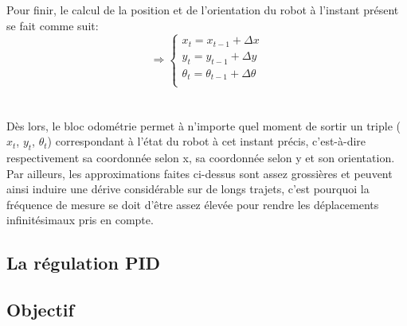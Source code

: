 \documentclass[a4paper,11pt]{article}
\begin{document}
Pour finir, le calcul de la position et de l'orientation du robot à l'instant présent se fait comme suit:
\begin{equation*}
    \Rightarrow\left\{
      \begin{aligned}
        x_{t} = x_{t-1} + \Delta x\\
        y_{t} = y_{t-1} + \Delta y\\
        \theta_{t} = \theta_{t-1} + \Delta\theta\\
        \end{aligned}
    \right.
\end{equation*}\\\\
Dès lors, le bloc odométrie permet à n'importe quel moment de sortir un triple ($x_{t}$, $y_{t}$, $\theta_{t}$) correspondant à l'état du robot à cet instant précis, c'est-à-dire respectivement sa coordonnée selon x, sa coordonnée selon y et son orientation. Par ailleurs, les approximations faites ci-dessus sont assez grossières et peuvent ainsi induire une dérive considérable sur de longs trajets, c'est pourquoi la fréquence de mesure se doit d'être assez élevée pour rendre les déplacements infinitésimaux pris en compte.

\subsection{La régulation PID}

\subsection{Objectif}
\end{document}
